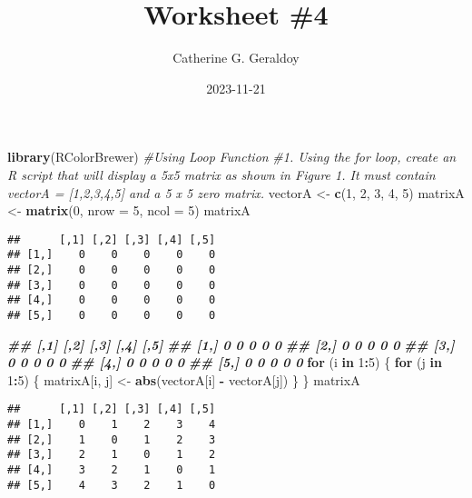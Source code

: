 \documentclass[
]{article}
\title{Worksheet \#4}
\author{Catherine G. Geraldoy}
\date{2023-11-21}
\newenvironment{Shaded}{\begin{snugshade}}{\end{snugshade}}
\newcommand{\AttributeTok}[1]{\textcolor[rgb]{0.13,0.29,0.53}{#1}}
\newcommand{\CommentTok}[1]{\textcolor[rgb]{0.56,0.35,0.01}{\textit{#1}}}
\newcommand{\ControlFlowTok}[1]{\textcolor[rgb]{0.13,0.29,0.53}{\textbf{#1}}}
\newcommand{\DecValTok}[1]{\textcolor[rgb]{0.00,0.00,0.81}{#1}}
\newcommand{\DocumentationTok}[1]{\textcolor[rgb]{0.56,0.35,0.01}{\textbf{\textit{#1}}}}
\newcommand{\FunctionTok}[1]{\textcolor[rgb]{0.13,0.29,0.53}{\textbf{#1}}}
\newcommand{\NormalTok}[1]{#1}
\newcommand{\OtherTok}[1]{\textcolor[rgb]{0.56,0.35,0.01}{#1}}
\newcommand{\SpecialCharTok}[1]{\textcolor[rgb]{0.81,0.36,0.00}{\textbf{#1}}}
\begin{document}
\maketitle

\begin{Shaded}
\begin{Highlighting}[]
\FunctionTok{library}\NormalTok{(RColorBrewer)}
\CommentTok{\#Using Loop Function}
\CommentTok{\#1. Using the for loop, create an R script that will display a 5x5 matrix as shown in Figure 1. It must contain vectorA = [1,2,3,4,5] and a 5 x 5 zero matrix.}
\NormalTok{vectorA }\OtherTok{\textless{}{-}} \FunctionTok{c}\NormalTok{(}\DecValTok{1}\NormalTok{, }\DecValTok{2}\NormalTok{, }\DecValTok{3}\NormalTok{, }\DecValTok{4}\NormalTok{, }\DecValTok{5}\NormalTok{)}
\NormalTok{matrixA }\OtherTok{\textless{}{-}} \FunctionTok{matrix}\NormalTok{(}\DecValTok{0}\NormalTok{, }\AttributeTok{nrow =} \DecValTok{5}\NormalTok{, }\AttributeTok{ncol =} \DecValTok{5}\NormalTok{)}
\NormalTok{matrixA}
\end{Highlighting}
\end{Shaded}

\begin{verbatim}
##      [,1] [,2] [,3] [,4] [,5]
## [1,]    0    0    0    0    0
## [2,]    0    0    0    0    0
## [3,]    0    0    0    0    0
## [4,]    0    0    0    0    0
## [5,]    0    0    0    0    0
\end{verbatim}

\begin{Shaded}
\begin{Highlighting}[]
\DocumentationTok{\#\# [,1] [,2] [,3] [,4] [,5]}
\DocumentationTok{\#\# [1,] 0 0 0 0 0}
\DocumentationTok{\#\# [2,] 0 0 0 0 0}
\DocumentationTok{\#\# [3,] 0 0 0 0 0}
\DocumentationTok{\#\# [4,] 0 0 0 0 0}
\DocumentationTok{\#\# [5,] 0 0 0 0 0}
\ControlFlowTok{for}\NormalTok{ (i }\ControlFlowTok{in} \DecValTok{1}\SpecialCharTok{:}\DecValTok{5}\NormalTok{) \{}
\ControlFlowTok{for}\NormalTok{ (j }\ControlFlowTok{in} \DecValTok{1}\SpecialCharTok{:}\DecValTok{5}\NormalTok{) \{}
\NormalTok{matrixA[i, j] }\OtherTok{\textless{}{-}} \FunctionTok{abs}\NormalTok{(vectorA[i] }\SpecialCharTok{{-}}\NormalTok{ vectorA[j])}
\NormalTok{\}}
\NormalTok{\}}
\NormalTok{matrixA}
\end{Highlighting}
\end{Shaded}

\begin{verbatim}
##      [,1] [,2] [,3] [,4] [,5]
## [1,]    0    1    2    3    4
## [2,]    1    0    1    2    3
## [3,]    2    1    0    1    2
## [4,]    3    2    1    0    1
## [5,]    4    3    2    1    0
\end{verbatim}
\end{document}
